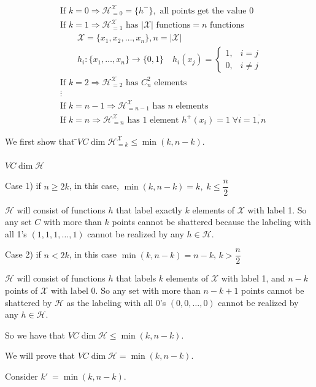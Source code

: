 \documentclass{article}
\newcommand{\<}{\langle}
\renewcommand{\>}{\rangle}
\theoremstyle{definition}
\def\gH{{\mathcal{H}}}
\def\gX{{\mathcal{X}}}
\newcommand{\vcd}[1]{VC \dim{#1}}
\newcommand{\szo}{\{0, 1\}}
\newcommand{\hkx}[1]{\gH_{=#1}^{\gX}}
\newcommand{\vcd}[1]{\text{VCdim}(#1)}
\newcommand{\szo}{\{0, 1\}}
\newcommand{\col}{\colon}
\newcommand{\ra}{\rightarrow}
\begin{document}
\begin{align*}
 &\text{If } k = 0 \Rightarrow \hkx{0} = \{h^-\}, \text{ all points get the value } 0 \\
 &\text{If } k = 1 \Rightarrow \hkx{1} \text{ has } |\gX| 
\text{ functions} = n \text{ functions} \\
& \qquad\gX = \{x_1, x_2, \dots, x_n\}, n = |\gX| \\
&\qquad h_i \col \{x_1, \dots, x_n\} \ra \szo \quad
h_i(x_j) = \begin{cases}
  1, & i = j \\
  0, & i \neq j
\end{cases} \\
 &\text{If } k = 2 \Rightarrow \hkx{2} \text{ has } C_n^2 \text{ elements} \\
 &\vdots \\
 &\text{If } k = n-1 \Rightarrow \hkx{n-1} \text { has } n \text{ elements} \\
 &\text{If } k = n \Rightarrow \hkx{n} \text{ has } 1 \text{ element } h^+(x_i) = 1 \; \forall i = \overline{1, n}
\end{align*}

\begin{tabbing}
We first show that \=$\vcd{\hkx{k}} \leq \min(k, n-k)$. \\
\>\qquad{} \\
\>$\vcd{\gH}$
\end{tabbing}

Case 1) if $n \geq 2k$, in this case, $\min(k, n-k) = k, \; k \leq \dfrac{n}{2}$

$\gH$ will consist of functions $h$ that label exactly $k$ elements of $\gX$ with label 1. So any set $C$ with more than $k$ points cannot be shattered because the labeling with all 1's $(1, 1, 1, \dots, 1)$ cannot be realized by any $h \in \gH$.

Case 2) if $n < 2k$, in this case $\min(k, n-k) = n-k$, $k > \dfrac{n}{2}$

$\gH$ will consist of functions $h$ that labels $k$ elements of $\gX$ with label 1, and $n-k$ points of $\gX$ with label 0. So any set with more than $n-k+1$ points cannot be shattered by $\gH$ as the labeling with all 0's $(0, 0, \dots, 0)$ cannot be realized by any $h \in \gH$.

So we have that $\vcd{\gH} \leq \min(k, n-k)$.

We will prove that $\vcd{\gH} = \min(k, n-k)$.

Consider $k'\ = \min(k, n-k)$.
\end{document}
